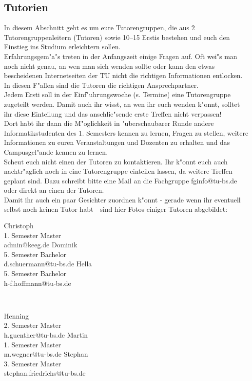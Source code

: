 \subsection{Tutorien}

In diesem Abschnitt geht es um eure Tutorengruppen, die aus 2 Tutorengruppenleitern (Tutoren) sowie 10--15 Erstis bestehen und euch den Einstieg ins Studium erleichtern sollen.\\
Erfahrungsgem"a"s treten in der Anfangszeit einige Fragen auf. Oft wei"s man noch nicht genau, an wen man sich wenden sollte oder kann den etwas bescheidenen Internetseiten der TU nicht die richtigen Informationen entlocken. In diesen F"allen sind die Tutoren die richtigen Ansprechpartner.\\
Jedem Ersti soll in der Einf"uhrungswoche (s. Termine) eine Tutorengruppe zugeteilt werden. Damit auch ihr wisst, an wen ihr euch wenden k"onnt, solltet ihr diese Einteilung und das anschlie"sende erste Treffen nicht verpassen!\\
Dort habt ihr dann die M"oglichkeit in "uberschaubarer Runde andere Informatikstudenten des 1. Semesters kennen zu lernen, Fragen zu stellen, weitere Informationen zu euren Veranstaltungen und Dozenten zu erhalten und das Campusgel"ande kennen zu lernen.\\
Scheut euch nicht einen der Tutoren zu kontaktieren. Ihr k"onnt euch auch nachtr"aglich noch in eine Tutorengruppe einteilen lassen, da weitere Treffen geplant sind. Dazu schreibt bitte eine Mail an die Fachgruppe fginfo@tu-bs.de oder direkt an einen der Tutoren.\\
Damit ihr auch ein paar Gesichter zuordnen k"onnt - gerade wenn ihr eventuell selbst noch keinen Tutor habt - sind hier Fotos einiger Tutoren abgebildet:

\onecolumn

{Christoph\\ 1. Semester Master\\ admin@keeg.de}
\hfill
{}
{Dominik\\5. Semester Bachelor\\ d.schuermann@tu-bs.de}
\hfill
{}
{Hella\\ 5. Semester Bachelor\\ h-f.hoffmann@tu-bs.de}
\par \ \par
{}
{Henning\\ 2. Semester Master\\ h.guenther@tu-bs.de}
\hfill
{}
{Martin\\ 1. Semester Master\\ m.wegner@tu-bs.de}
\hfill
{}
{Stephan\\ 3. Semester Master\\ stephan.friedrichs@tu-bs.de}

